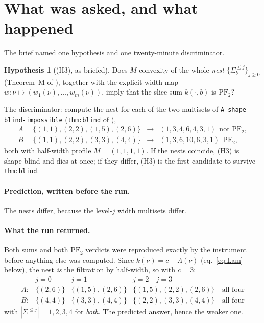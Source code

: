 \documentclass[11pt]{article}
\theoremstyle{plain}
\theoremstyle{definition}
\newtheorem{hypothesis}[theorem]{Hypothesis}
\newcommand{\PFtwo}{\mathrm{PF}_2}
\begin{document}
\section{What was asked, and what happened}\label{sec:firstmove}

The brief named one hypothesis and one twenty-minute discriminator.

\begin{hypothesis}[(H3), as briefed]\label{hyp:H3}
Does $M$-convexity of the whole \emph{nest} $\{\Sigma_b^{\le j}\}_{j\ge0}$ (Theorem~M of
\cite{c1004}), together with the explicit width map $w:\nu\mapsto(w_1(\nu),\dots,w_m(\nu))$,
imply that the slice sum $k(\cdot,b)$ is $\PFtwo$?
\end{hypothesis}

The discriminator: compute the nest for each of the two multisets of
\texttt{A-shape-blind-impossible} (\texttt{thm:blind} of \cite{c1002}),
\[
\begin{array}{lll}
  A=\{(1,1),(2,2),(1,5),(2,6)\} &\longrightarrow& (1,3,4,6,4,3,1)\ \ \text{not }\PFtwo,\\[2pt]
  B=\{(1,1),(2,2),(3,3),(4,4)\} &\longrightarrow& (1,3,6,10,6,3,1)\ \ \PFtwo,
\end{array}
\]
both with half-width profile $M=(1,1,1,1)$. If the nests coincide, (H3) is shape-blind
and dies at once; if they differ, (H3) is the first candidate to survive
\texttt{thm:blind}.

\paragraph{Prediction, written before the run.} The nests differ, because the level-$j$
width multisets differ.

\paragraph{What the run returned.} Both sums and both $\PFtwo$ verdicts were reproduced
exactly by the instrument before anything else was computed. Since $k(\nu)=c-\Lambda(\nu)$
(eq.~\eqref{eq:Lam} below), the nest \emph{is} the filtration by half-width, so with
$c=3$:
\[
\begin{array}{llll}
 & j=0 & j=1 & j=2\quad j=3\\
A:& \{(2,6)\} & \{(1,5),(2,6)\} & \{(1,5),(2,2),(2,6)\}\quad \text{all four}\\
B:& \{(4,4)\} & \{(3,3),(4,4)\} & \{(2,2),(3,3),(4,4)\}\quad \text{all four}
\end{array}
\]
with $|\Sigma^{\le j}|=1,2,3,4$ for \emph{both}. The predicted answer, hence the weaker
one.
\end{document}
